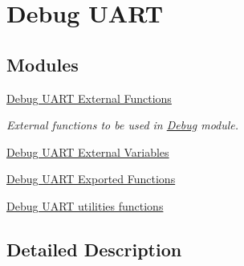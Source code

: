 \hypertarget{group___debug___uart}{}\section{Debug U\+A\+RT}
\label{group___debug___uart}
\subsection*{Modules}
\begin{DoxyCompactItemize}
\item 
\hyperlink{group___debug___u_a_r_t___external___functions}{Debug U\+A\+R\+T External Functions}
\begin{DoxyCompactList}\small\item\em External functions to be used in \hyperlink{group___debug}{Debug} module. \end{DoxyCompactList}\item 
\hyperlink{group___debug___u_a_r_t___external___variables}{Debug U\+A\+R\+T External Variables}
\item 
\hyperlink{group___debug___uart___exported___functions}{Debug U\+A\+R\+T Exported Functions}
\item 
\hyperlink{group___debug___uart___exported___functions___group2}{Debug U\+A\+R\+T utilities functions}
\end{DoxyCompactItemize}


\subsection{Detailed Description}

